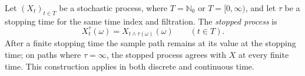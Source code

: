 
Let $(X_t)_{t\in T}$ be a stochastic process, where $T=\mathbb N_0$ or $T=[0,\infty)$, and let $\tau$ be a stopping time for the same time index and filtration. The \emph{stopped process} is
\[
X_t^\tau(\omega)=X_{t\wedge\tau(\omega)}(\omega)\qquad(t\in T).
\]
After a finite stopping time the sample path remains at its value at the stopping time; on paths where $\tau=\infty$, the stopped process agrees with $X$ at every finite time. This construction applies in both discrete and continuous time.

